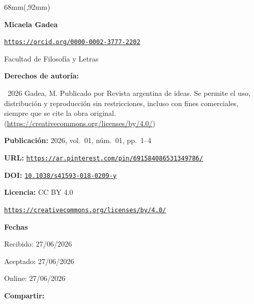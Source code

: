 \begin{textblock*}{68mm}(\gbbloquex,92mm)
{\setlength{\leftskip}{0pt}\setlength{\parindent}{0pt}%
\noindent\begin{minipage}[t]{68mm}
\sffamily\small\setlength{\parskip}{1pt}
{\bfseries\color{azulrevista}Micaela Gadea}\par
{\scriptsize\texttt{\href{https://orcid.org/0000-0002-3777-2202}{https://orcid.org/0000-0002-3777-2202}}}\par
Facultad de Filosofía y Letras\par
\vspace{6pt}
{\bfseries\color{azulrevista!70}Derechos de autor\'ia:}\par
\textcopyright\ 2026 Gadea, M. Publicado por Revista argentina de ideas. Se permite el uso, distribución y reproducción sin restricciones, incluso con fines comerciales, siempre que se cite la obra original. (\href{https://creativecommons.org/licenses/by/4.0/}{https://creativecommons.org/licenses/by/4.0/})\par\vspace{6pt}
{\bfseries\color{azulrevista!70}Publicación:} 2026, vol.~01, n\'um.~01, pp.~1--4\par\vspace{6pt}
{\bfseries\color{azulrevista!70}URL:} {\scriptsize\texttt{\href{https://ar.pinterest.com/pin/691584086531349786/}{https://ar.pinterest.com/pin/691584086531349786/}}}\par\vspace{6pt}
{\bfseries\color{azulrevista!70}DOI:} {\scriptsize\texttt{\href{https://doi.org/10.1038/s41593-018-0209-y}{10.1038/s41593-018-0209-y}}}\par\vspace{6pt}
{\bfseries\color{azulrevista!70}Licencia:} CC BY 4.0\par
{\scriptsize\texttt{\href{https://creativecommons.org/licenses/by/4.0/}{https://creativecommons.org/licenses/by/4.0/}}}\par
\vspace{6pt}
{\bfseries\color{azulrevista!70}Fechas}\par\vspace{2pt}
Recibido: 27/06/2026\par
Aceptado: 27/06/2026\par
Online: 27/06/2026\par
\vspace{6pt}
\vspace{6pt}
{\bfseries\color{azulrevista!70}Compartir:}\par\vspace{3pt}

\end{minipage}}
\end{textblock*}
